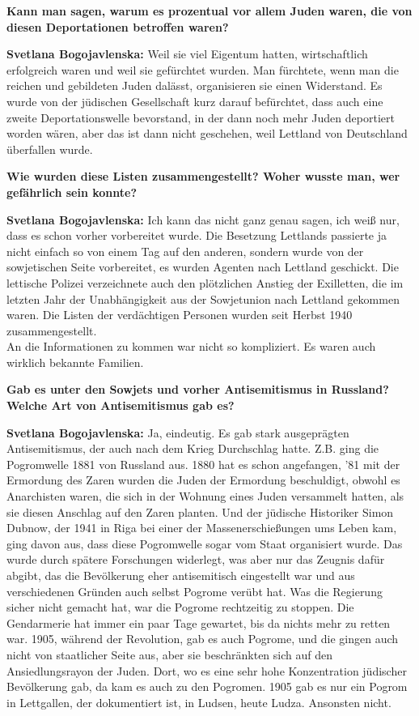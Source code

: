 \textbf{Kann man sagen, warum es prozentual vor allem Juden waren, die von diesen Deportationen betroffen waren?}

\textbf{Svetlana Bogojavlenska:} Weil sie viel Eigentum hatten, wirtschaftlich erfolgreich waren und weil sie gefürchtet wurden. Man fürchtete, wenn man die reichen und gebildeten Juden dalässt, organisieren sie einen Widerstand. Es wurde von der jüdischen Gesellschaft kurz darauf befürchtet, dass auch eine zweite Deportationswelle bevorstand, in der dann noch mehr Juden deportiert worden wären, aber das ist dann nicht geschehen, weil Lettland von Deutschland überfallen wurde.

\textbf{Wie wurden diese Listen zusammengestellt? Woher wusste man, wer gefährlich sein konnte?} 

\textbf{Svetlana Bogojavlenska:} Ich kann das nicht ganz genau sagen, ich weiß nur, dass es schon vorher vorbereitet wurde. Die Besetzung Lettlands passierte ja nicht einfach so von einem Tag auf den anderen, sondern wurde von der sowjetischen Seite vorbereitet, es wurden Agenten nach Lettland geschickt. Die lettische Polizei verzeichnete auch den plötzlichen Anstieg der Exilletten, die im letzten Jahr der Unabhängigkeit aus der Sowjetunion nach Lettland gekommen waren. Die Listen der verdächtigen Personen wurden seit Herbst 1940 zusammengestellt.\\
An die Informationen zu kommen war nicht so kompliziert. Es waren auch wirklich bekannte Familien.

\textbf{Gab es unter den Sowjets und vorher Antisemitismus in Russland? Welche Art von Antisemitismus gab es?}

\textbf{Svetlana Bogojavlenska:} Ja, eindeutig. Es gab stark ausgeprägten Antisemitismus, der auch nach dem Krieg Durchschlag hatte.
Z.B. ging die Pogromwelle 1881 von Russland aus. 1880 hat es schon angefangen, '81 mit der Ermordung des Zaren wurden die Juden der Ermordung beschuldigt, obwohl es Anarchisten waren, die sich in der Wohnung eines Juden versammelt hatten, als sie diesen Anschlag auf den Zaren planten. Und der jüdische Historiker Simon Dubnow, der 1941 in Riga bei einer der Massenerschießungen ums Leben kam, ging davon aus, dass diese Pogromwelle sogar vom Staat organisiert wurde. Das wurde durch spätere Forschungen widerlegt, was aber nur das Zeugnis dafür abgibt, das die Bevölkerung eher antisemitisch eingestellt war und aus verschiedenen Gründen auch selbst Pogrome verübt hat. Was die Regierung sicher nicht gemacht hat, war die Pogrome rechtzeitig zu stoppen. Die Gendarmerie hat immer ein paar Tage gewartet, bis da nichts mehr zu retten war.
1905, während der Revolution, gab es auch Pogrome, und die gingen auch nicht von staatlicher Seite aus, aber sie beschränkten sich auf den Ansiedlungsrayon der Juden. Dort, wo es eine sehr hohe Konzentration jüdischer Bevölkerung gab, da kam es auch zu den Pogromen. 1905 gab es nur ein Pogrom in Lettgallen, der dokumentiert ist, in Ludsen, heute Ludza. Ansonsten nicht. 

